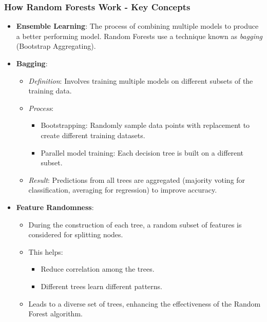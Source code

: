 \documentclass[aspectratio=169]{beamer}
\begin{document}
\begin{frame}[fragile]
    \frametitle{How Random Forests Work - Key Concepts}
    \begin{itemize}
        \item \textbf{Ensemble Learning}: The process of combining multiple models to produce a better performing model. Random Forests use a technique known as \textit{bagging} (Bootstrap Aggregating).
        
        \item \textbf{Bagging}:
            \begin{itemize}
                \item \textit{Definition}: Involves training multiple models on different subsets of the training data.
                \item \textit{Process}:
                    \begin{itemize}
                        \item Bootstrapping: Randomly sample data points with replacement to create different training datasets.
                        \item Parallel model training: Each decision tree is built on a different subset.
                    \end{itemize}
                \item \textit{Result}: Predictions from all trees are aggregated (majority voting for classification, averaging for regression) to improve accuracy.
            \end{itemize}
        
        \item \textbf{Feature Randomness}:
            \begin{itemize}
                \item During the construction of each tree, a random subset of features is considered for splitting nodes.
                \item This helps:
                    \begin{itemize}
                        \item Reduce correlation among the trees.
                        \item Different trees learn different patterns.
                    \end{itemize}
                \item Leads to a diverse set of trees, enhancing the effectiveness of the Random Forest algorithm.
            \end{itemize}
    \end{itemize}
\end{frame}
\end{document}
